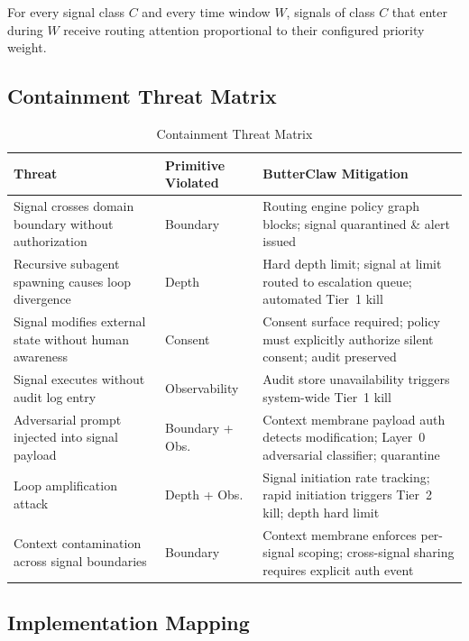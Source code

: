 \documentclass[11pt,a4paper]{article}
\newenvironment{property}[1][]
{
  \begin{tcolorbox}[
    title={#1},
    colback=white,
    colframe=black!50,
    fonttitle=\bfseries
  ]
}
{
  \end{tcolorbox}
}
\begin{document}
\begin{property}[Fairness]
For every signal class $C$ and every time window $W$, signals of class $C$ that enter during $W$
receive routing attention proportional to their configured priority weight.
\end{property}

\subsection{Containment Threat Matrix}

\begin{table}[htbp]
  \centering\small
  \caption{Containment Threat Matrix}
  \label{tab:threats}
  \begin{tabularx}{\linewidth}{L{4.2cm} L{2.8cm} L{6cm}}
    \toprule
    \textbf{Threat} & \textbf{Primitive Violated} & \textbf{ButterClaw Mitigation} \\
    \midrule
    Signal crosses domain boundary without authorization  & Boundary          & Routing engine policy graph blocks; signal quarantined \& alert issued \\
    Recursive subagent spawning causes loop divergence    & Depth             & Hard depth limit; signal at limit routed to escalation queue; automated Tier~1 kill \\
    Signal modifies external state without human awareness & Consent          & Consent surface required; policy must explicitly authorize silent consent; audit preserved \\
    Signal executes without audit log entry               & Observability     & Audit store unavailability triggers system-wide Tier~1 kill \\
    Adversarial prompt injected into signal payload       & Boundary + Obs.   & Context membrane payload auth detects modification; Layer~0 adversarial classifier; quarantine \\
    Loop amplification attack                             & Depth + Obs.      & Signal initiation rate tracking; rapid initiation triggers Tier~2 kill; depth hard limit \\
    Context contamination across signal boundaries        & Boundary          & Context membrane enforces per-signal scoping; cross-signal sharing requires explicit auth event \\
    \bottomrule
  \end{tabularx}
\end{table}

\subsection{Implementation Mapping}
\label{sec:invariant-mapping}
\end{document}
